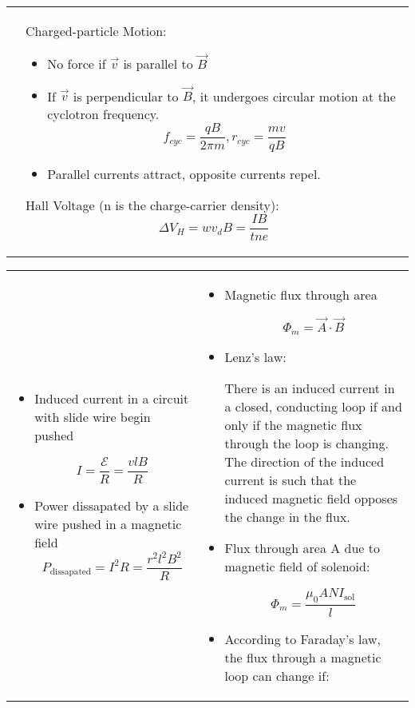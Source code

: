 \documentclass{article}
\begin{document}
\begin{center}
\begin{tabular}{|p{8cm}|p{8cm}|}
		                &

		Charged-particle Motion:
		\begin{itemize}
			\item No force if $\vec{v}$ is parallel to $\vec{B}$
			\item If $\vec{v}$ is perpendicular to $\vec{B}$, it undergoes circular motion at the cyclotron frequency.
			      \[ f_{cyc} = \frac{qB}{2\pi m}, r_{cyc} = \frac{mv}{qB}\]
			\item Parallel currents attract, opposite currents repel.
		\end{itemize}

		Hall Voltage (n is the charge-carrier density):
		\[ \Delta V_H = wv_dB = \frac{IB}{tne}\]                                            \\
	\end{tabular}
	\begin{tabular}{|p{8cm}|p{8cm}|}
		\hline

		\begin{itemize}
			\item Induced current in a circuit with slide wire begin pushed

			      \[ I = \frac{\mathcal{E}}{R} = \frac{vlB}{R} \]

			\item Power dissapated by a slide wire pushed in a magnetic field
			      \[ P_\text{dissapated} = I^2 R = \frac{r^2 l^2 B^2}{R} \]
		\end{itemize}


		 &

		\begin{itemize}
			\item Magnetic flux through area

			      \[ \Phi_m = \vec A \cdot \vec B \]

			\item Lenz's law:

			      There is an induced current in a closed, conducting loop if
			      and only if the magnetic flux through the loop is changing.
			      The direction of the induced current is such that the induced
			      magnetic field opposes the change in the flux.

			\item Flux through area A due to magnetic field of solenoid:

			      \[ \Phi_m = \frac{\mu_0 A N I_\text{sol}}{l} \]

			\item According to Faraday's law, the flux through a magnetic loop
			      can change if:


\end{itemize}
\end{tabular}
\end{center}
\end{document}
